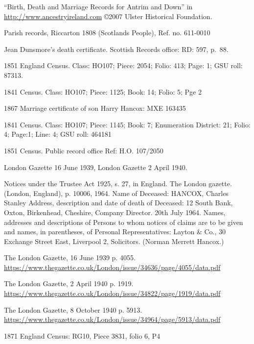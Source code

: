 \begin{thebibliography}{99}
	``Birth, Death and Marriage Records for Antrim and Down'' in
	\url{http://www.ancestryireland.com} \copyright 2007 Ulster Historical Foundation.

	Parish records, Riccarton 1808 (Scotlands People), Ref. no. 611-0010

	Jean Dunsmore's death certificate. Scottish Records office: RD: 597, p.~88.

	1851 England Census.
	Class: HO107; Piece: 2054; Folio: 413; Page: 1; GSU roll: 87313.
	
	1841 Census.
	Class: HO107; Piece: 1125; Book: 14; Folio: 5; Pge 2

	1867 Marriage certificate of son Harry Hancox: MXE 163435 

	1841 Census.
	Class: HO107; Piece: 1145; Book: 7; Enumeration District: 21; Folio: 4; Page:1; Line: 4; GSU roll: 464181
	
	1851 Census.
	Public record office Ref: H.O. 107/2050
	
	London Gazette 16 June 1939, London Gazette 2 April 1940.
	
	Notices under the Trustee Act 1925, s. 27, in England. The London gazette. (London, England), p. 10006, 1964.
	Name of Deceased: HANCOX, Charles Stanley
	Address, description and date of death of Deceased:
	12 South Bank, Oxton, Birkenhead, Cheshire, Company Director. 20th July 1964.
	Names, addresses and descriptions of Persons to whom notices of claims are to be given and names, in parentheses, of Personal Representatives:
	Layton \& Co., 30 Exchange Street East, Liverpool 2, Solicitors. (Norman Merrett Hancox.)

	The London Gazette, 16 June 1939 p. 4055.
	\url{https://www.thegazette.co.uk/London/issue/34636/page/4055/data.pdf}
	
	The London Gazette, 2 April 1940 p. 1919.
	\url{https://www.thegazette.co.uk/London/issue/34822/page/1919/data.pdf}

	The London Gazette, 8 October 1940 p. 5913.
	\url{https://www.thegazette.co.uk/London/issue/34964/page/5913/data.pdf}
	
	1871 England Census: RG10, Piece 3831, folio 6, P4
	

\end{thebibliography}
